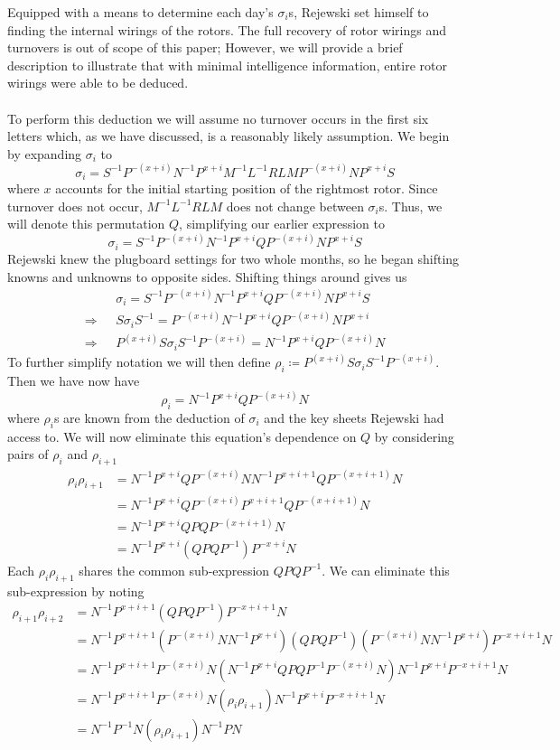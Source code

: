 Equipped with a means to determine each day's $\sigma_i$s, Rejewski set
himself to finding the internal wirings of the rotors. The full
recovery of rotor wirings and turnovers is out of scope of this paper;
However, we will provide a brief description to illustrate that with
minimal intelligence information, entire rotor wirings were able to be deduced.
\\\\To perform this deduction we will assume no turnover occurs in the first six letters which, as we have discussed, is a reasonably likely assumption. We begin by expanding $\sigma_i$ to
\[
  \sigma_i = S^{-1}P^{-(x+i)}N^{-1}P^{x+i}M^{-1}L^{-1}RLMP^{-(x+i)}NP^{x+i}S
\]
where $x$ accounts for the initial starting position of the rightmost rotor.
Since turnover does not occur, $M^{-1}L^{-1}RLM$ does not change between $\sigma_i$s. Thus, we will
denote this permutation $Q$, simplifying our earlier expression to
\[
  \sigma_i = S^{-1}P^{-(x+i)}N^{-1}P^{x+i}QP^{-(x+i)}NP^{x+i}S
\]
Rejewski knew the plugboard settings for two whole months, so he
began shifting knowns and unknowns to opposite sides. Shifting things
around gives us
\begin{align*}
  & \sigma_i = S^{-1}P^{-(x+i)}N^{-1}P^{x+i}QP^{-(x+i)}NP^{x+i}S \\
  \Rightarrow\text{ } & S\sigma_i S^{-1} =
  P^{-(x+i)}N^{-1}P^{x+i}QP^{-(x+i)}NP^{x+i}
  \\
  \Rightarrow\text{ } & P^{(x+i)}S\sigma_i S^{-1}P^{-(x+i)} =
  N^{-1}P^{x+i}QP^{-(x+i)}N
\end{align*}
To further simplify notation we will then define ${\rho_i} \coloneq
P^{(x+i)}S\sigma_i S^{-1}P^{-(x+i)}$. Then we have now have
\[
  \rho_i = N^{-1}P^{x+i}QP^{-(x+i)}N
\]
where $\rho_i$s are known from the deduction of $\sigma_i$ and the key sheets Rejewski had access to.
We will now eliminate this equation's dependence on $Q$ by considering
pairs of $\rho_i$ and $\rho_{i+1}$
\begin{align*}
  \rho_i\rho_{i+1} & = N^{-1}P^{x+i}QP^{-(x+i)}NN^{-1}P^{x+i+1}QP^{-(x+i+1)}N \\
  & = N^{-1}P^{x+i}QP^{-(x+i)}P^{x+i+1}QP^{-(x+i+1)}N        \\
  & = N^{-1}P^{x+i}QPQP^{-(x+i+1)}N                          \\
  & =N^{-1}P^{x+i}(QPQP^{-1})P^{-{x+i}}N
\end{align*}
Each $\rho_i\rho_{i+1}$ shares the common sub-expression $QPQP^{-1}$.
We can eliminate this sub-expression by noting
\begin{align*}
  \rho_{i+1}\rho_{i+2} & = N^{-1}P^{x+i+1}(QPQP^{-1})P^{-{x+i+1}}N
  \\
  & =
  N^{-1}P^{x+i+1}(P^{-(x+i)}NN^{-1}P^{x+i})(QPQP^{-1})(P^{-(x+i)}NN^{-1}P^{x+i})P^{-{x+i+1}}N
  \\
  & =
  N^{-1}P^{x+i+1}P^{-(x+i)}N(N^{-1}P^{x+i}QPQP^{-1}P^{-(x+i)}N)N^{-1}P^{x+i}P^{-{x+i+1}}N
  \\
  & =
  N^{-1}P^{x+i+1}P^{-(x+i)}N(\rho_i\rho_{i+1})N^{-1}P^{x+i}P^{-{x+i+1}}N
  \\
  & = N^{-1}P^{-1}N(\rho_i\rho_{i+1})N^{-1}PN
  \\
\end{align*}
